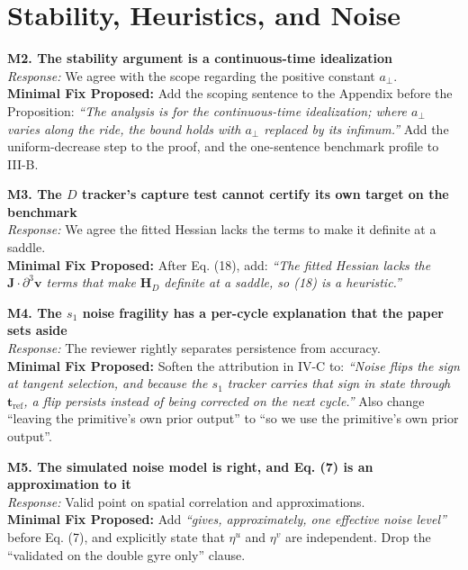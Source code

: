 \documentclass[10pt]{article}
\begin{document}
\vspace{-0.2cm}
\section*{Stability, Heuristics, and Noise}

\textbf{M2. The stability argument is a continuous-time idealization} \\
\textit{Response:} We agree with the scope regarding the positive constant $a_\perp$. \\
\textbf{Minimal Fix Proposed:} Add the scoping sentence to the Appendix before the Proposition: \textit{``The analysis is for the continuous-time idealization; where $a_\perp$ varies along the ride, the bound holds with $a_\perp$ replaced by its infimum.''} Add the uniform-decrease step to the proof, and the one-sentence benchmark profile to III-B.

\textbf{M3. The $D$ tracker's capture test cannot certify its own target on the benchmark} \\
\textit{Response:} We agree the fitted Hessian lacks the terms to make it definite at a saddle. \\
\textbf{Minimal Fix Proposed:} After Eq. (18), add: \textit{``The fitted Hessian lacks the $\mathbf{J}\cdot\partial^3\mathbf{v}$ terms that make $\mathbf{H}_D$ definite at a saddle, so (18) is a heuristic.''}

\textbf{M4. The $s_1$ noise fragility has a per-cycle explanation that the paper sets aside} \\
\textit{Response:} The reviewer rightly separates persistence from accuracy. \\
\textbf{Minimal Fix Proposed:} Soften the attribution in IV-C to: \textit{``Noise flips the sign at tangent selection, and because the $s_1$ tracker carries that sign in state through $\mathbf{t}_{\mathrm{ref}}$, a flip persists instead of being corrected on the next cycle.''} Also change ``leaving the primitive's own prior output'' to ``so we use the primitive's own prior output''.

\textbf{M5. The simulated noise model is right, and Eq. (7) is an approximation to it} \\
\textit{Response:} Valid point on spatial correlation and approximations. \\
\textbf{Minimal Fix Proposed:} Add \textit{``gives, approximately, one effective noise level''} before Eq. (7), and explicitly state that $\eta^u$ and $\eta^v$ are independent. Drop the ``validated on the double gyre only'' clause.
\end{document}

